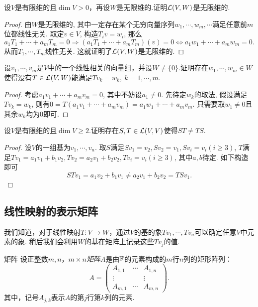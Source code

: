 \begin{exercise}
	设$V$是有限维的且$\dim V>0$，再设$W$是无限维的.证明$\mathcal{L} (V,W)$是无限维的.
\end{exercise}
\begin{proof}
	由$W$是无限维的, 其中一定存在某个无穷向量序列$w_1,\cdots ,w_m,\cdots$满足任意前$m$位都线性无关. 取定$v \in V$, 构造$T_iv=w_i$, 那么$$a_1T_1 + \cdots + a_mT_m = 0 \Rightarrow (a_1T_1 + \cdots + a_mT_m)(v)=0 \Leftrightarrow a_1w_1 + \cdots + a_mw_m = 0.$$
	从而$T_1,\cdots ,T_m$线性无关. 这就证明了$\mathcal{L} (V,W)$是无限维的. 
\end{proof}

\begin{exercise}
	设$v_1, \cdots ,v_m$是$V$中的一个线性相关的向量组，并设$W \neq \{ 0 \}$.证明存在$w_1, \cdots ,w_m \in W$使得没有$T \in \mathcal{L} (V,W)$能满足$Tv_k=w_k,~k=1,\cdots ,m$.
\end{exercise}
\begin{proof}
	考虑$a_1v_1+\cdots +a_mv_m=0$, 其中不妨设$a_1 \neq 0$. 先待定$w_k$的取法, 假设满足$Tv_k=w_k$, 则有$0=T(a_1v_1+\cdots + a_mv_m)=a_1w_1+\cdots + a_mv_m$. 只需要取$w_1 \neq 0$且其余$w_k$均为$0$即可. 
\end{proof}

\begin{exercise}
	设$V$是有限维的且$\dim V \geq 2$.证明存在$S,T \in \mathcal{L} (V,V)$使得$ST \neq TS$.
\end{exercise}
\begin{proof}
	设$V$的一组基为$v_1,\cdots ,v_n$. 取$S$满足$Sv_1=v_2,Sv_2=v_1,Sv_i=v_i(i\geq 3)$, $T$满足$Tv_1=a_1v_1+b_1v_2,Tv_2=a_2v_1+b_2v_2,Tv_i=v_i(i\geq 3)$, 其中$a,b$待定. 如下构造即可$$STv_1=a_1v_2+b_1v_1 \neq a_2v_1+b_2v_2 = TSv_1. $$
\end{proof}

\subsection{线性映射的表示矩阵}

我们知道，对于线性映射$T:V \to W$，通过$V$的基的象$Tv_1, \cdots ,Tv_n$可以确定任意$V$中元素的象. 稍后我们会利用$W$的基在矩阵上记录这些$Tv_j$的值.

\begin{definition}{矩阵}
	设正整数$m,n$，$m \times n$\textit{矩阵}$A$是由$\mathbb{F}$的元素构成的$m$行$n$列的矩形阵列：$$A = 
	\begin{pmatrix}
		A_{1,1} & \cdots & A_{1,n} \\
		\vdots &  & \vdots \\
		A_{m,1} & \cdots & A_{m,n}
	\end{pmatrix}.$$
	其中，记号$A_{j,k}$表示$A$的第$j$行第$k$列的元素.
\end{definition}

